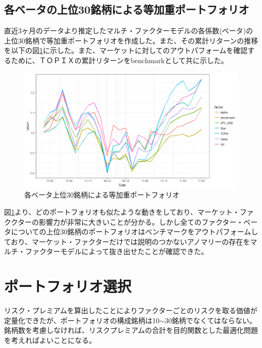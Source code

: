 \documentclass[11pt]{jreport}
\begin{document}
\subsection{各ベータの上位30銘柄による等加重ポートフォリオ}
直近3ヶ月のデータより推定したマルチ・ファクターモデルの各係数(ベータ)の上位30銘柄で等加重ポートフォリオを作成した。また、その累計リターンの推移を以下の図\ref{fig:factor_top30}に示した。また、マーケットに対してのアウトパフォームを確認するために、ＴＯＰＩＸの累計リターンをbenchmarkとして共に示した。


\begin{figure}[H]
	\begin{center}
		\includegraphics[width=15cm]{./fig/factor_top30.png}
		\caption{各ベータ上位30銘柄による等加重ポートフォリオ}
		\label{fig:factor_top30}
	\end{center}
\end{figure}


図\ref{fig:factor_top30}より、どのポートフォリオも似たような動きをしており、マーケット・ファククターの影響力が非常に大きいことが分かる。しかし全てのファクター・ベータについての上位30銘柄のポートフォリオはベンチマークをアウトパフォームしており、マーケット・ファクターだけでは説明のつかないアノマリーの存在をマルチ・ファクターモデルによって抜き出せたことが確認できた。

\section{ポートフォリオ選択}
リスク・プレミアムを算出したことによりファクターごとのリスクを取る価値が定量化できたが、ポートフォリオの構成銘柄は10$\sim$30銘柄でなくてはならない。銘柄数を考慮しなければ、リスクプレミアムの合計を目的関数とした最適化問題を考えればよいことになる。
\end{document}
